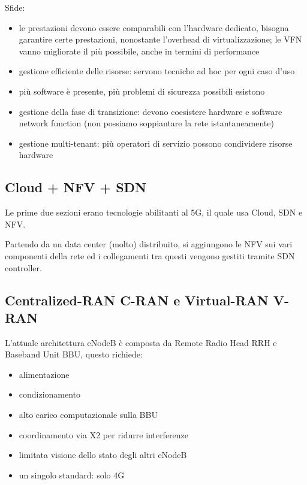 Sfide: 
\begin{itemize}
	\item le prestazioni devono essere comparabili con l'hardware dedicato, bisogna garantire certe prestazioni, nonostante l'overhead di virtualizzazione; le VFN vanno migliorate il più possibile, anche in termini di performance

	\item gestione efficiente delle risorse: servono tecniche ad hoc per ogni caso d'uso

	\item più software è presente, più problemi di sicurezza possibili esistono

	\item gestione della fase di transizione: devono coesistere hardware e software network function (non possiamo soppiantare la rete istantaneamente)

	\item gestione multi-tenant: più operatori di servizio possono condividere risorse hardware
\end{itemize}

\subsection*{Cloud + NFV + SDN}

Le prime due sezioni erano tecnologie abilitanti al 5G, il quale usa Cloud, SDN e NFV.

Partendo da un data center (molto) distribuito, si aggiungono le NFV sui vari componenti della rete ed i collegamenti tra questi vengono gestiti tramite SDN controller.

\subsection{Centralized-RAN C-RAN e Virtual-RAN V-RAN}

L'attuale architettura eNodeB è composta da Remote Radio Head RRH e Baseband Unit BBU, questo richiede: 
\begin{itemize}
	\item alimentazione
	
    \item condizionamento
	
    \item alto carico computazionale sulla BBU
	
    \item coordinamento via X2 per ridurre interferenze
	
    \item limitata visione dello stato degli altri eNodeB
	
    \item un singolo standard: solo 4G
\end{itemize}

